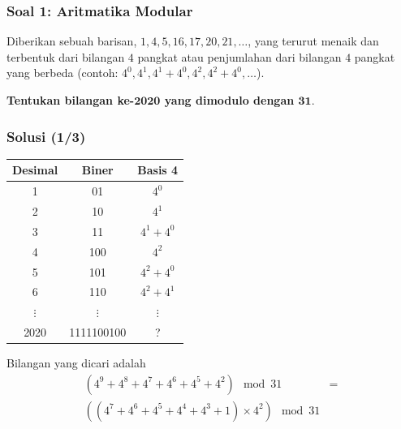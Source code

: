 \documentclass[english,t]{beamer}
\begin{document}
\begin{frame}
  \frametitle{Soal 1: Aritmatika Modular} 
Diberikan sebuah barisan, $1, 4, 5, 16, 17, 20, 21, \ldots$, yang terurut menaik dan terbentuk dari bilangan $4$ pangkat atau penjumlahan dari bilangan $4$ pangkat yang berbeda (contoh: $4^0, 4^1, 4^1 + 4^0, 4^2, 4^2 + 4^0, \ldots$).

\textbf{Tentukan bilangan ke-$\bm{2020}$ yang dimodulo dengan $\bm{31}$}.
\end{frame}


\begin{frame}
  \frametitle{Solusi (1/3)}

\begin{table}[!ht]
	\centering
	\begin{tabular}{|c|c|c|}
		\hline
		\multicolumn{1}{|c}{\textbf{Desimal}} & \multicolumn{1}{|c|}{\textbf{Biner}} & \multicolumn{1}{c|}{\textbf{Basis 4}} \\
		\hline
		1 & 01 & $4^0$ \\
		\hline
		2 & 10 & $4^1$ \\
		\hline
		3 & 11 & $4^1 + 4^0$ \\
		\hline 
		4 & 100 & $4^2$ \\
		\hline
		5 & 101 & $4^2 + 4^0$ \\
		\hline
		6 & 110 & $4^2 + 4^1$ \\
		\hline 
		$\vdots$ & $\vdots$ & $\vdots$ \\
		\hline
		2020 & 1111100100 & ? \\
		\hline
	\end{tabular}	
\end{table}
Bilangan yang dicari adalah
\begin{align*}
	(4^9 + 4^8 + 4^7 + 4^6 + 4^5 + 4^2) \mod 31 &= \\
	((4^7 + 4^6 + 4^5 +4^4 +4^3 + 1) \times 4^2 ) \mod 31 &
\end{align*}
\end{frame}
\end{document}
